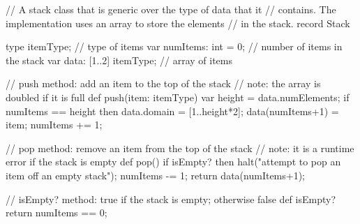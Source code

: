 \begin{numberedchapel}
// A stack class that is generic over the type of data that it
// contains.  The implementation uses an array to store the elements
// in the stack.
record Stack {
  type itemType;            // type of items
  var numItems: int = 0;    // number of items in the stack
  var data: [1..2] itemType; // array of items

  // push method: add an item to the top of the stack
  // note: the array is doubled if it is full
  def push(item: itemType) {
    var height = data.numElements;
    if numItems == height then
      data.domain = [1..height*2];
    data(numItems+1) = item;
    numItems += 1;
  }

  // pop method: remove an item from the top of the stack
  // note: it is a runtime error if the stack is empty
  def pop() {
    if isEmpty? then
      halt("attempt to pop an item off an empty stack");
    numItems -= 1;
    return data(numItems+1);
  }

  // isEmpty? method: true if the stack is empty; otherwise false
  def isEmpty? return numItems == 0;
}
\end{numberedchapel}
